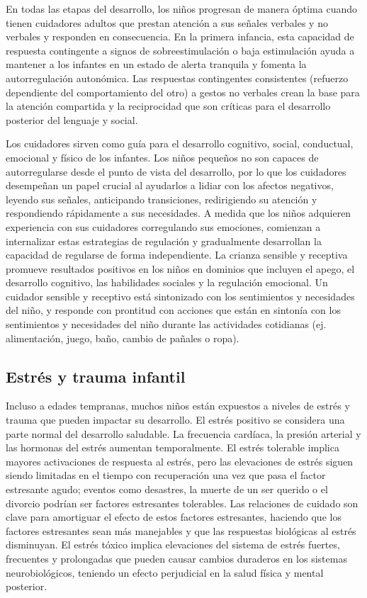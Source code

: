 \documentclass[11pt,letterpaper]{report}
\begin{document}
En todas las etapas del desarrollo, los niños progresan de manera óptima
cuando tienen cuidadores adultos que prestan atención a sus señales verbales y
no verbales y responden en consecuencia. En la primera infancia, esta
capacidad de respuesta contingente a signos de sobreestimulación o baja
estimulación ayuda a mantener a los infantes en un estado de alerta tranquila y
fomenta la autorregulación autonómica. Las respuestas contingentes consistentes
(refuerzo dependiente del comportamiento del otro) a gestos no verbales crean
la base para la atención compartida y la reciprocidad que son críticas para el
desarrollo posterior del lenguaje y social. \cite{Nelson19}

Los cuidadores sirven como guía para el desarrollo cognitivo, social,
conductual, emocional y físico de los infantes. Los niños pequeños no son
capaces de autorregularse desde el punto de vista del desarrollo, por lo que
los cuidadores desempeñan un papel crucial al ayudarlos a lidiar con los
afectos negativos, leyendo sus señales, anticipando transiciones, redirigiendo
su atención y respondiendo rápidamente a sus necesidades. A medida que los
niños adquieren experiencia con sus cuidadores corregulando sus emociones,
comienzan a internalizar estas estrategias de regulación y gradualmente
desarrollan la capacidad de regularse de forma independiente. La crianza
sensible y receptiva promueve resultados positivos en los niños en dominios que
incluyen el apego, el desarrollo cognitivo, las habilidades sociales y la
regulación emocional. Un cuidador sensible y receptivo está sintonizado con los
sentimientos y necesidades del niño, y responde con prontitud con acciones que
están en sintonía con los sentimientos y necesidades del niño durante las
actividades cotidianas (ej. alimentación, juego, baño, cambio de pañales o
ropa). \cite{Feldman3}

\subsection{Estrés y trauma infantil}
Incluso a edades tempranas, muchos niños están expuestos a niveles de estrés y
trauma que pueden impactar su desarrollo. El estrés positivo se considera una
parte normal del desarrollo saludable. La frecuencia cardíaca, la presión
arterial y las hormonas del estrés aumentan temporalmente. El estrés tolerable
implica mayores activaciones de respuesta al estrés, pero las elevaciones de
estrés siguen siendo limitadas en el tiempo con recuperación una vez que pasa
el factor estresante agudo; eventos como desastres, la muerte de un ser
querido o el divorcio podrían ser factores estresantes tolerables. Las
relaciones de cuidado son clave para amortiguar el efecto de estos factores
estresantes, haciendo que los factores estresantes sean más manejables y que
las respuestas biológicas al estrés disminuyan. El estrés tóxico implica
elevaciones del sistema de estrés fuertes, frecuentes y prolongadas que pueden
causar cambios duraderos en los sistemas neurobiológicos, teniendo un efecto
perjudicial en la salud física y mental posterior. \cite{Feldman3}
\end{document}
